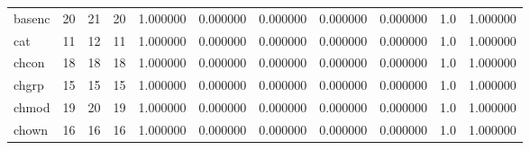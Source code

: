 \begin{tabular}{lrrrrrrrrrr}
basenc    &                                      20 &                 21 &                                20 &                                   1.000000 &                               0.000000 &                                     0.000000 &                          0.000000 &                                0.000000 &                                1.0 &                                           1.000000 \\
cat       &                                      11 &                 12 &                                11 &                                   1.000000 &                               0.000000 &                                     0.000000 &                          0.000000 &                                0.000000 &                                1.0 &                                           1.000000 \\
chcon     &                                      18 &                 18 &                                18 &                                   1.000000 &                               0.000000 &                                     0.000000 &                          0.000000 &                                0.000000 &                                1.0 &                                           1.000000 \\
chgrp     &                                      15 &                 15 &                                15 &                                   1.000000 &                               0.000000 &                                     0.000000 &                          0.000000 &                                0.000000 &                                1.0 &                                           1.000000 \\
chmod     &                                      19 &                 20 &                                19 &                                   1.000000 &                               0.000000 &                                     0.000000 &                          0.000000 &                                0.000000 &                                1.0 &                                           1.000000 \\
chown     &                                      16 &                 16 &                                16 &                                   1.000000 &                               0.000000 &                                     0.000000 &                          0.000000 &                                0.000000 &                                1.0 &                                           1.000000 \\

\end{tabular}

